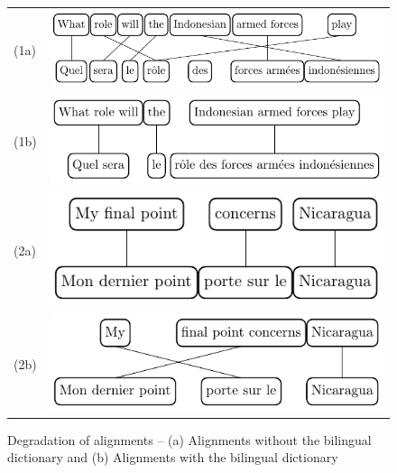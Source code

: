 \documentclass[output=paper,modfonts,nonflat]{langsci/langscibook}
\begin{document}
\begin{figure}
\centering
\begin{tabular}{lC}
(1a) & \includegraphics[scale=.9]{figures/figSemmar3}\\[1ex]
(1b) & \includegraphics[scale=.9]{figures/figSemmar7}\\[2ex]
(2a) & \includegraphics[scale=.9]{figures/figSemmar8}\\[1ex]
(2b) & \includegraphics[scale=.9]{figures/figSemmar9}\\
\end{tabular}
\caption{\label{sem:fig:degali}Degradation of alignments -- (a) Alignments without the bilingual dictionary and (b) Alignments with the bilingual dictionary}
\end{figure}
\end{document}
